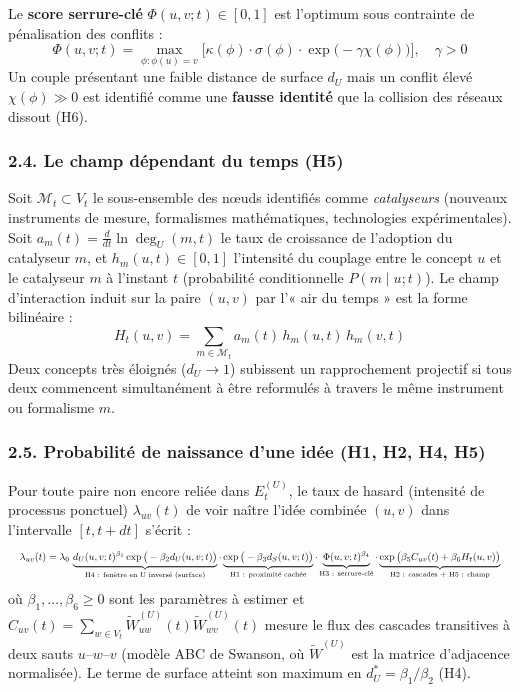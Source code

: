 \documentclass[a4paper,11pt]{article}
\begin{document}
Le \textbf{score serrure-clé} \(\Phi(u,v;t) \in [0,1]\) est l'optimum
sous contrainte de pénalisation des conflits :
\[\Phi(u, v; t) = \max_{\phi : \phi(u)=v} \Big[ \kappa(\phi) \cdot \sigma(\phi) \cdot \exp\big(-\gamma \chi(\phi)\big) \Big], \quad \gamma > 0\]
Un couple présentant une faible distance de surface \(d_U\) mais un
conflit élevé \(\chi(\phi) \gg 0\) est identifié comme une
\textbf{fausse identité} que la collision des réseaux dissout (H6).

\subsubsection*{2.4. Le champ dépendant du temps (H5)}

Soit \(\mathcal{M}_t \subset V_t\) le sous-ensemble des nœuds identifiés
comme \emph{catalyseurs} (nouveaux instruments de mesure, formalismes
mathématiques, technologies expérimentales). Soit
\(a_m(t) = \frac{d}{dt}\ln \deg_U(m, t)\) le taux de croissance de
l'adoption du catalyseur \(m\), et \(h_m(u, t) \in [0,1]\) l'intensité
du couplage entre le concept \(u\) et le catalyseur \(m\) à l'instant
\(t\) (probabilité conditionnelle \(P(m \mid u; t)\)). Le champ
d'interaction induit sur la paire \((u,v)\) par l'« air du temps » est
la forme bilinéaire :
\[H_t(u, v) = \sum_{m \in \mathcal{M}_t} a_m(t)\, h_m(u, t)\, h_m(v, t)\]
Deux concepts très éloignés (\(d_U \to 1\)) subissent un rapprochement
projectif si tous deux commencent simultanément à être reformulés à
travers le même instrument ou formalisme \(m\).

\subsubsection*{2.5. Probabilité de naissance d'une idée (H1, H2, H4,
H5)}

Pour toute paire non encore reliée dans \(E^{(U)}_t\), le taux de hasard
(intensité de processus ponctuel) \(\lambda_{uv}(t)\) de voir naître
l'idée combinée \((u,v)\) dans l'intervalle \([t, t+dt]\) s'écrit :
\[\resizebox{\linewidth}{!}{$\displaystyle \lambda_{uv}(t) = \lambda_0 \, \underbrace{d_U(u,v;t)^{\beta_1} \exp\big(-\beta_2 d_U(u,v;t)\big)}_{\text{H4 : fenêtre en U inversé (surface)}} \cdot \underbrace{\exp\big(-\beta_3 d_S(u,v;t)\big)}_{\text{H1 : proximité cachée}} \cdot \underbrace{\Phi(u,v;t)^{\beta_4}}_{\text{H3 : serrure-clé}} \cdot \underbrace{\exp\big(\beta_5 C_{uv}(t) + \beta_6 H_t(u,v)\big)}_{\text{H2 : cascades + H5 : champ}}$}\]
où \(\beta_1, \dots, \beta_6 \ge 0\) sont les paramètres à estimer et
\(C_{uv}(t) = \sum_{w \in V_t} \tilde{W}^{(U)}_{uw}(t)\tilde{W}^{(U)}_{wv}(t)\)
mesure le flux des cascades transitives à deux sauts
\(u\text{--}w\text{--}v\) (modèle ABC de Swanson, où \(\tilde{W}^{(U)}\)
est la matrice d'adjacence normalisée). Le terme de surface atteint son
maximum en \(d_U^* = \beta_1 / \beta_2\) (H4).
\end{document}
